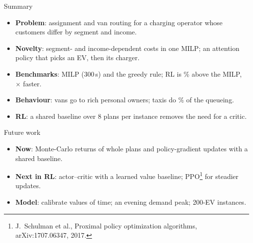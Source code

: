 \documentclass[aspectratio=169,11pt,t]{beamer}
\begin{document}
\begin{frame}{Summary}
\begin{itemize}
  \item \textbf{Problem}: assignment and van routing for a charging operator whose customers differ by segment and income.
  \item \textbf{Novelty}: segment- and income-dependent costs in one MILP; an attention policy that picks an EV, then its charger.
  \item \textbf{Benchmarks}: MILP (300\,s) and the greedy rule; RL is \GapMean\% above the MILP, \Speed{}$\times$ faster.
  \item \textbf{Behaviour}: vans go to rich personal owners; taxis do \QShareComM\% of the queueing.
  \item \textbf{RL}: a shared baseline over 8 plans per instance removes the need for a critic.
\end{itemize}
\end{frame}

\begin{frame}{Future work}
\begin{itemize}
  \item \textbf{Now}: Monte-Carlo returns of whole plans and policy-gradient updates with a shared baseline.
  \item \textbf{Next in RL}: actor--critic with a learned value baseline; PPO\footnote{J.~Schulman et al., Proximal policy optimization algorithms, arXiv:1707.06347, 2017.} for steadier updates.
  \item \textbf{Model}: calibrate values of time; an evening demand peak; 200-EV instances.
\end{itemize}
\end{frame}
\end{document}
